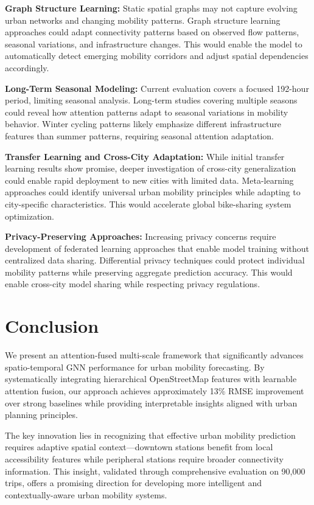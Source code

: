 \documentclass[sigconf,review,nonacm]{acmart}
\begin{document}
\textbf{Graph Structure Learning:}
Static spatial graphs may not capture evolving urban networks and changing mobility patterns. Graph structure learning approaches could adapt connectivity patterns based on observed flow patterns, seasonal variations, and infrastructure changes. This would enable the model to automatically detect emerging mobility corridors and adjust spatial dependencies accordingly.

\textbf{Long-Term Seasonal Modeling:}
Current evaluation covers a focused 192-hour period, limiting seasonal analysis. Long-term studies covering multiple seasons could reveal how attention patterns adapt to seasonal variations in mobility behavior. Winter cycling patterns likely emphasize different infrastructure features than summer patterns, requiring seasonal attention adaptation.

\textbf{Transfer Learning and Cross-City Adaptation:}
While initial transfer learning results show promise, deeper investigation of cross-city generalization could enable rapid deployment to new cities with limited data. Meta-learning approaches could identify universal urban mobility principles while adapting to city-specific characteristics. This would accelerate global bike-sharing system optimization.

\textbf{Privacy-Preserving Approaches:}
Increasing privacy concerns require development of federated learning approaches that enable model training without centralized data sharing. Differential privacy techniques could protect individual mobility patterns while preserving aggregate prediction accuracy. This would enable cross-city model sharing while respecting privacy regulations.

\section{Conclusion}

We present an attention-fused multi-scale framework that significantly advances spatio-temporal GNN performance for urban mobility forecasting. By systematically integrating hierarchical OpenStreetMap features with learnable attention fusion, our approach achieves approximately 13\% RMSE improvement over strong baselines while providing interpretable insights aligned with urban planning principles.

The key innovation lies in recognizing that effective urban mobility prediction requires adaptive spatial context—downtown stations benefit from local accessibility features while peripheral stations require broader connectivity information. This insight, validated through comprehensive evaluation on 90,000 trips, offers a promising direction for developing more intelligent and contextually-aware urban mobility systems.
\end{document}
